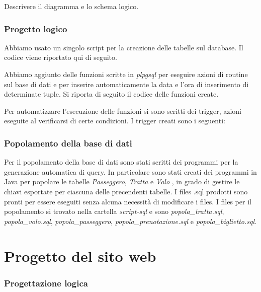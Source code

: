 \documentclass[a4paper,10pt]{article}
\begin{document}
Descrivere il diagramma e lo schema logico.

\section{Progetto logico}

Abbiamo usato un singolo script per la creazione delle tabelle sul database. Il codice viene riportato qui di seguito.



Abbiamo aggiunto delle funzioni scritte in \textit{plpgsql} per eseguire azioni di routine sul base di dati e per inserire automaticamente la data e l'ora di inserimento di determinate tuple.
Si riporta di seguito il codice delle funzioni create.



Per automatizzare l'esecuzione delle funzioni si sono scritti dei trigger, azioni eseguite al verificarsi di certe condizioni. I trigger creati sono i seguenti:



\section{Popolamento della base di dati}
Per il popolamento della base di dati sono stati scritti dei programmi per la generazione automatica di query.
In particolare sono stati creati dei programmi in Java per popolare le tabelle \textit{Passeggero}, \textit{Tratta} e \textit{Volo} , in grado di gestire 
le chiavi esportate per ciascuna delle precendenti tabelle. I files .sql prodotti sono pronti 
per essere eseguiti senza alcuna necessit\`a di modificare i files. I files per il popolamento si trovato nella cartella \textit{script-sql} e sono \textit{popola_tratta.sql},
\textit{popola_volo.sql}, \textit{popola_passeggero}, \textit{popola_prenotazione.sql} e \textit{popola_biglietto.sql}.


\part{Progetto del sito web}

\section{Progettazione logica}
\end{document}
